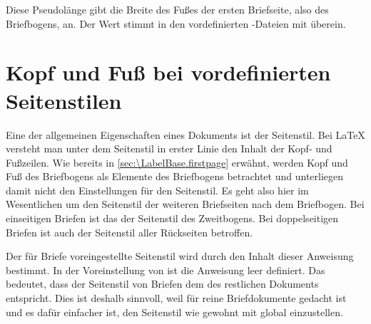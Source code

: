 \begin{Declaration}
\end{Declaration}
Diese Pseudolänge gibt die Breite des Fußes der ersten Briefseite, also des
Briefbogens, an. Der Wert stimmt in den vordefinierten -Dateien mit
%
 überein.%
%
\EndIndexGroup
%
\EndIndexGroup
%
\EndIndexGroup

\iffree{}{\clearpage}%



\section{Kopf und Fuß bei vordefinierten Seitenstilen}
\BeginIndexGroup
{}

Eine der allgemeinen Eigenschaften eines Dokuments ist der Seitenstil. Bei
{\LaTeX} versteht man unter dem Seitenstil in erster Linie den Inhalt der
Kopf- und Fußzeilen. Wie bereits in
\autoref{sec:\LabelBase.firstpage} erwähnt, werden Kopf und Fuß des Briefbogens
als Elemente des Briefbogens betrachtet und unterliegen damit nicht den
Einstellungen für den Seitenstil. Es geht also hier im Wesentlichen um den
Seitenstil der weiteren Briefseiten nach dem Briefbogen. Bei einseitigen
Briefen ist das der Seitenstil des Zweitbogens. Bei doppelseitigen Briefen ist
auch der Seitenstil aller Rückseiten betroffen.


\begin{Declaration}
\end{Declaration}
Der für Briefe
voreingestellte Seitenstil wird durch den Inhalt dieser Anweisung bestimmt. In
der Voreinstellung von
 ist die Anweisung leer
definiert. Das bedeutet, dass der Seitenstil von Briefen dem des restlichen
Dokuments entspricht. Dies ist deshalb sinnvoll, weil  für
reine Briefdokumente gedacht ist und es dafür einfacher ist, den Seitenstil
wie gewohnt mit  global einzustellen.

